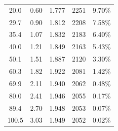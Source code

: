 \documentclass{thuemp}
\begin{document}
\begin{itemize}
\begin{table}[H]
\begin{tabular}{ccccc}
        20.0   & 0.60  & 1.777 & 2251 & 9.70\%  \\
        29.7   & 0.90  & 1.812 & 2208 & 7.58\%  \\
        35.4   & 1.07  & 1.832 & 2183 & 6.40\%  \\
        40.0   & 1.21  & 1.849 & 2163 & 5.43\%  \\
        50.1   & 1.51  & 1.887 & 2120 & 3.30\%  \\
        60.3   & 1.82  & 1.922 & 2081 & 1.42\%  \\
        69.9   & 2.11  & 1.940 & 2062 & 0.48\%  \\
        80.0   & 2.41  & 1.946 & 2055 & 0.17\%  \\
        89.4   & 2.70  & 1.948 & 2053 & 0.07\%  \\
        100.5  & 3.03  & 1.949 & 2052 & 0.02\%  \\
        \bottomrule
    \end{tabular}
\end{table}


\end{itemize}
\end{document}
